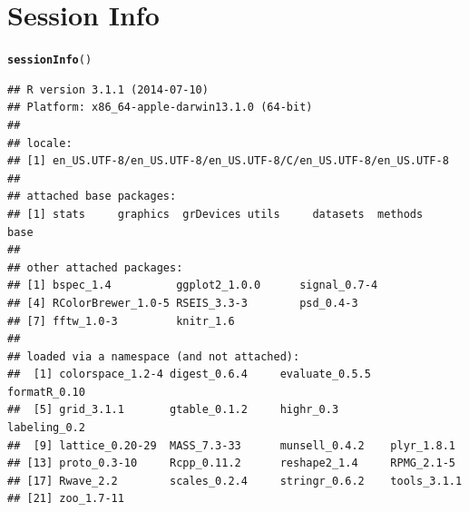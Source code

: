 \documentclass[10pt]{article}\usepackage[]{graphicx}\usepackage[]{color}
\makeatletter
\newcommand{\hlstd}[1]{\textcolor[rgb]{0.345,0.345,0.345}{#1}}%
\newcommand{\hlkwd}[1]{\textcolor[rgb]{0.737,0.353,0.396}{\textbf{#1}}}%
\newenvironment{kframe}{%
 \def\at@end@of@kframe{}%
 \ifinner\ifhmode%
  \def\at@end@of@kframe{\end{minipage}}%
  \begin{minipage}{\columnwidth}%
 \fi\fi%
 \def\FrameCommand##1{\hskip\@totalleftmargin \hskip-\fboxsep
 \colorbox{shadecolor}{##1}\hskip-\fboxsep
     \hskip-\linewidth \hskip-\@totalleftmargin \hskip\columnwidth}%
 \MakeFramed {\advance\hsize-\width
   \@totalleftmargin\z@ \linewidth\hsize
   \@setminipage}}%
 {\par\unskip\endMakeFramed%
 \at@end@of@kframe}
\newenvironment{knitrout}{}{} %
\makeatother
\begin{document}
\section*{Session Info}
\begin{knitrout}
\color{fgcolor}\begin{kframe}
\begin{alltt}
\hlkwd{sessionInfo}\hlstd{()}
\end{alltt}
\begin{verbatim}
## R version 3.1.1 (2014-07-10)
## Platform: x86_64-apple-darwin13.1.0 (64-bit)
## 
## locale:
## [1] en_US.UTF-8/en_US.UTF-8/en_US.UTF-8/C/en_US.UTF-8/en_US.UTF-8
## 
## attached base packages:
## [1] stats     graphics  grDevices utils     datasets  methods   base     
## 
## other attached packages:
## [1] bspec_1.4          ggplot2_1.0.0      signal_0.7-4      
## [4] RColorBrewer_1.0-5 RSEIS_3.3-3        psd_0.4-3         
## [7] fftw_1.0-3         knitr_1.6         
## 
## loaded via a namespace (and not attached):
##  [1] colorspace_1.2-4 digest_0.6.4     evaluate_0.5.5   formatR_0.10    
##  [5] grid_3.1.1       gtable_0.1.2     highr_0.3        labeling_0.2    
##  [9] lattice_0.20-29  MASS_7.3-33      munsell_0.4.2    plyr_1.8.1      
## [13] proto_0.3-10     Rcpp_0.11.2      reshape2_1.4     RPMG_2.1-5      
## [17] Rwave_2.2        scales_0.2.4     stringr_0.6.2    tools_3.1.1     
## [21] zoo_1.7-11
\end{verbatim}
\end{kframe}
\end{knitrout}


\end{document}
